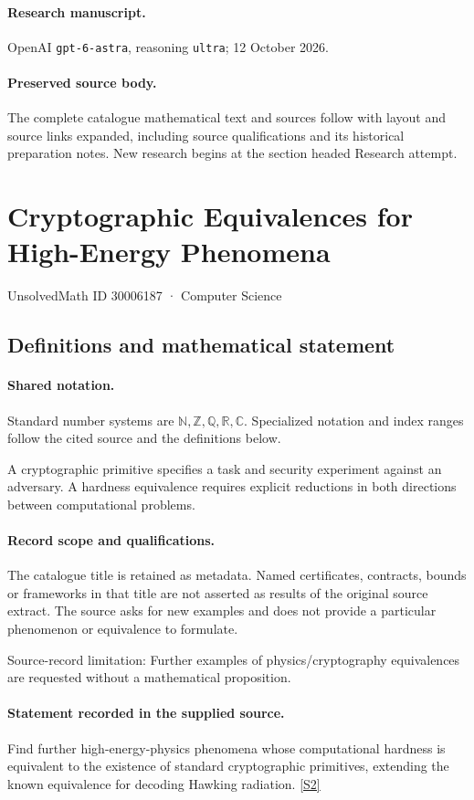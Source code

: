 \documentclass[11pt]{article}
\begin{document}
\paragraph{Research manuscript.} OpenAI \texttt{gpt-6-astra}, reasoning \texttt{ultra}; 12 October 2026.
\paragraph{Preserved source body.} The complete catalogue mathematical text and sources follow with layout and source links expanded, including source qualifications and its historical preparation notes. New research begins at the section headed Research attempt.

\section{Cryptographic Equivalences for High-Energy Phenomena}\label{30006187}
{\small UnsolvedMath ID 30006187 · Computer Science}
\subsection{Definitions and mathematical statement}

\paragraph{Shared notation.}Standard number systems are $\mathbb N,\mathbb Z,\mathbb Q,\mathbb R,\mathbb C$. Specialized notation and index ranges follow the cited source and the definitions below.


A cryptographic primitive specifies a task and security experiment against an adversary. A hardness equivalence requires explicit reductions in both directions between computational problems.
\paragraph{Record scope and qualifications.}
The catalogue title is retained as metadata. Named certificates, contracts, bounds or frameworks in that title are not asserted as results of the original source extract.
The source asks for new examples and does not provide a particular phenomenon or equivalence to formulate.

Source-record limitation: Further examples of physics/cryptography equivalences are requested without a mathematical proposition.
\paragraph{Statement recorded in the supplied source.}
Find further high-energy-physics phenomena whose computational hardness is equivalent to the existence of standard cryptographic primitives, extending the known equivalence for decoding Hawking radiation. \href{https://doi.org/10.4171/owr/2025/3}{[S2]}
\end{document}
